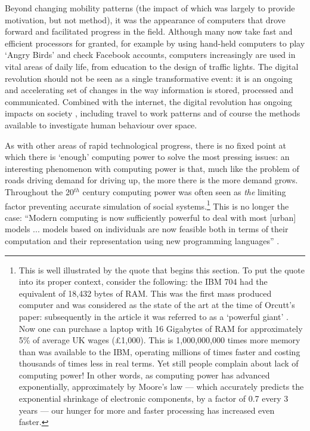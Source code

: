 Beyond changing mobility patterns (the impact of which was largely to provide
motivation, but not method), it was the appearance of computers that drove
forward and facilitated progress in the field. Although many now
take fast and efficient processors for granted, for example by using hand-held computers
to play `Angry Birds' and check Facebook accounts, computers increasingly are used in vital areas of
daily life, from
education to the design of traffic lights. The digital revolution should not
be seen as a single transformative event: it is an ongoing and accelerating
set of changes in the way information is stored, processed and communicated.
Combined with the internet, the digital revolution has ongoing
impacts on society \citep{Rushkoff2011}, including travel to work patterns
\citep{Orloff2003} and of course the methods available to investigate human
behaviour over space.

As with other areas of rapid technological progress, there is no
fixed point at which there is `enough' computing power to solve the
most pressing issues: an interesting phenomenon with computing power
is that, much like the problem of roads driving demand for driving up, the more
there is the more demand grows. Throughout the 20$^{th}$ century computing power
was often seen
as \emph{the} limiting factor preventing accurate simulation of social
systems.\footnote{This
is well illustrated by the quote that begins this section. To
put the quote into its proper context, consider the following: the
IBM 704 had the equivalent of 18,432 bytes of RAM. This was the first mass
produced computer and was
considered as the state of the art at the time of Orcutt's paper:
subsequently in the article it was referred to as a `powerful giant'
\citep{Orcutt1957-new-type}. Now one can purchase a laptop with 16 Gigabytes of
RAM for approximately 5\% of average UK wages (\pounds1,000). This is
1,000,000,000
times more memory than was available to the IBM, operating millions of times
faster and costing thousands of times less in real terms. Yet still people
complain about lack of computing power! In other words, as computing power has
advanced exponentially, approximately by Moore's law --- which accurately
predicts the exponential shrinkage of electronic components, by a factor of 0.7
every 3 years \citep{kish2002end} --- our hunger for more and faster processing
has increased even faster.
}
This is no longer the case: ``Modern computing is now sufficiently powerful to
deal with most [urban] models ... models based on individuals are
now feasible both in terms of their computation and their representation
using new programming languages'' \citep[p.~5]{batty2007cities}.


